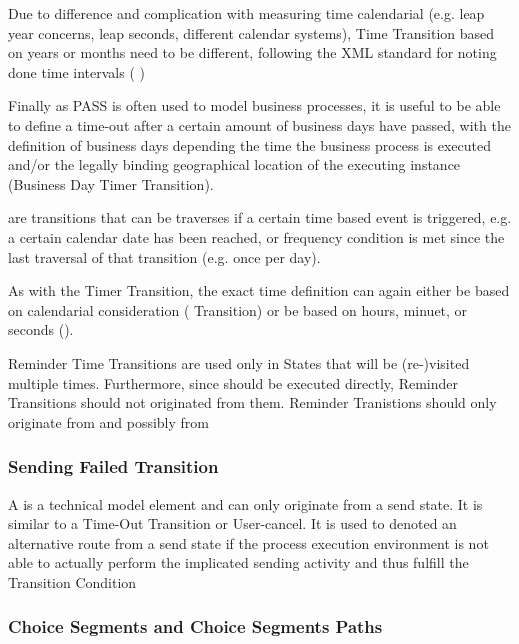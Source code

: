 Due to difference and complication with measuring time calendarial (e.g. leap year concerns, leap seconds, different calendar systems), Time Transition based on years or months need to be different, following the XML standard for noting done time intervals ( )

Finally as PASS is often used to model business processes, it is useful to be able to define a time-out after a certain amount of business days have passed, with the definition of business days depending the time the business process is executed and/or the legally binding geographical location of the executing instance (Business Day Timer Transition).

 are transitions that can be traverses if a certain time based event is triggered, e.g. a certain calendar date has been reached, or frequency condition is met  since the last traversal of that transition (e.g. once per day).

As with the Timer Transition, the exact time definition can again either be based on calendarial consideration ( Transition) or be based on hours, minuet, or seconds ().

Reminder Time Transitions are used only in States that will be (re-)visited multiple times. Furthermore, since  should be executed directly, Reminder Transitions should not originated from them. Reminder Tranistions should only originate from  and possibly from 

\subsubsection{Sending Failed Transition}

A  is a technical model element and can only originate from a send state. It is similar to a Time-Out Transition or User-cancel. It is used to denoted an alternative route from a send state if the process execution environment is not able to actually perform the implicated sending activity and thus fulfill the Transition Condition

\subsubsection{Choice Segments and Choice Segments Paths}
\label{sec:choiceSegement}

